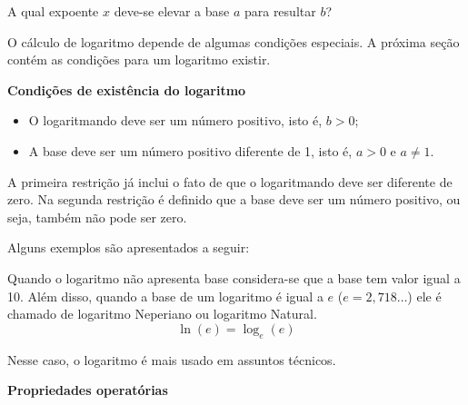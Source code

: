 	A qual expoente $x$ deve-se elevar a base $a$ para resultar $b$?
	
	O cálculo de logaritmo depende de algumas condições especiais. A próxima seção contém as condições para um logaritmo existir.
	
	\textbf{Condições de existência do logaritmo}
	\begin{itemize}
		\item  O logaritmando deve ser um número positivo, isto é, $b > 0$;
		\item  A base deve ser um número positivo diferente de 1, isto é, $ a >0 $ e $ a \neq 1$.
	\end{itemize}
	
	A primeira restrição já inclui o fato de que o logaritmando deve ser diferente de zero. Na segunda restrição é definido que a base deve ser um número positivo, ou seja, também não pode ser zero.
	
	Alguns exemplos são apresentados a seguir:
	   \begin{texample}
         \centering
        \end{texample}
        
	Quando o logaritmo não apresenta base considera-se que a base tem valor igual a 10. Além disso, quando a base de um logaritmo é igual a $e$ ($e = 2,718 \dots $) ele é chamado de logaritmo Neperiano ou logaritmo Natural. 
        \[
        \ln(e)= \log_e(e)
        \]
        
        Nesse caso, o logaritmo é mais usado em assuntos técnicos.

    \noindent
	\textbf{Propriedades operatórias}
	
